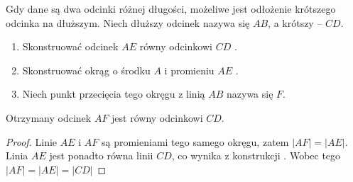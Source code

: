 \documentclass[12pt, a4paper]{scrartcl}
\begin{document}
\begin{theorem}

Gdy dane są dwa odcinki różnej długości, możeliwe jest odłożenie krótszego
odcinka na dłuższym. Niech dłuższy odcinek nazywa się \(AB\), a krótszy -- \(CD\).

\begin{figure}[h!]
    \begin{center}
    \end{center}
\end{figure}

\begin{enumerate}
    \item Skonstruować odcinek \(AE\) równy odcinkowi \(CD\) .
    \item Skonstruować okrąg o środku \(A\) i promieniu \(AE\) .
    \item Niech punkt przecięcia tego okręgu z linią \(AB\) nazywa się \(F\).
\end{enumerate}

Otrzymany odcinek \(AF\) jest równy odcinkowi \(CD\).

\begin{proof}
    Linie \(AE\) i \(AF\) są promieniami tego samego okręgu, zatem \(|AF| =
    |AE|\). Linia \(AE\) jest ponadto równa linii \(CD\), co wynika z
    konstrukcji . Wobec tego \(|AF| = |AE| = |CD|\) 
\end{proof}
\end{theorem}
\end{document}
